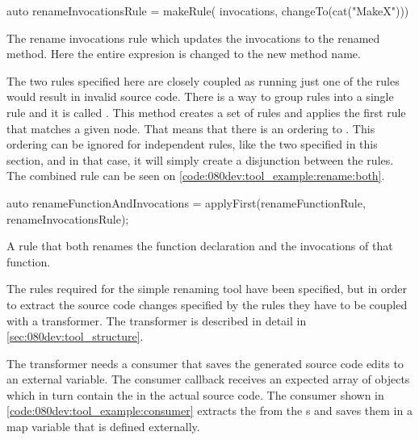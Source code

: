 \begin{listing}[H]
    \begin{cppcode}
auto renameInvocationsRule = makeRule(
    invocations, changeTo(cat("MakeX")))
    \end{cppcode}
    \caption{The rename invocations rule which updates the invocations to the renamed method. Here the entire expresion is changed to the new method name.}
    \label{code:080dev:tool_example:rename:invocation}
\end{listing}

The two rules specified here are closely coupled as running just one of the rules would result in invalid source code. There is a way to group rules into a single rule and it is called . This method creates a set of rules and applies the first rule that matches a given node. That means that there is an ordering to . This ordering can be ignored for independent rules, like the two specified in this section, and in that case, it will simply create a disjunction between the rules. The combined rule can be seen on \cref{code:080dev:tool_example:rename:both}.

\begin{listing}[H]
    \begin{cppcode}
auto renameFunctionAndInvocations = applyFirst({renameFunctionRule, renameInvocationsRule});
    \end{cppcode}
    \caption{A rule that both renames the function declaration and the invocations of that function.}
    \label{code:080dev:tool_example:rename:both}
\end{listing}

The rules required for the simple renaming tool have been specified, but in order to extract the source code changes specified by the rules they have to be coupled with a transformer. The transformer is described in detail in \cref{sec:080dev:tool_structure}.

The transformer needs a consumer that saves the generated source code edits to an external variable. The consumer callback receives an expected array of  objects which in turn contain the  in the actual source code. The consumer shown in \cref{code:080dev:tool_example:consumer} extracts the  from the s and saves them in a map variable that is defined externally.

